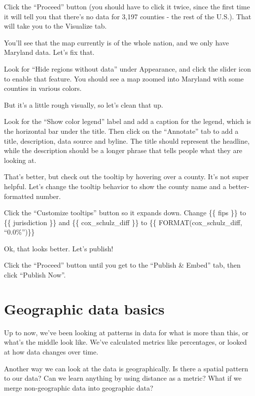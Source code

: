 \documentclass[
  letterpaper,
  DIV=11,
  numbers=noendperiod]{scrreprt}
\begin{document}
Click the ``Proceed'' button (you should have to click it twice, since
the first time it will tell you that there's no data for 3,197 counties
- the rest of the U.S.). That will take you to the Visualize tab.

You'll see that the map currently is of the whole nation, and we only
have Maryland data. Let's fix that.

Look for ``Hide regions without data'' under Appearance, and click the
slider icon to enable that feature. You should see a map zoomed into
Maryland with some counties in various colors.

But it's a little rough visually, so let's clean that up.

Look for the ``Show color legend'' label and add a caption for the
legend, which is the horizontal bar under the title. Then click on the
``Annotate'' tab to add a title, description, data source and byline.
The title should represent the headline, while the description should be
a longer phrase that tells people what they are looking at.

That's better, but check out the tooltip by hovering over a county. It's
not super helpful. Let's change the tooltip behavior to show the county
name and a better-formatted number.

Click the ``Customize tooltips'' button so it expands down. Change \{\{
fips \}\} to \{\{ jurisdiction \}\} and \{\{ cox\_schulz\_diff \}\} to
\{\{ FORMAT(cox\_schulz\_diff, ``0.0\%'')\}\}

Ok, that looks better. Let's publish!

Click the ``Proceed'' button until you get to the ``Publish \& Embed''
tab, then click ``Publish Now''.


\hypertarget{geographic-data-basics}{%
\chapter{Geographic data basics}\label{geographic-data-basics}}

Up to now, we've been looking at patterns in data for what is more than
this, or what's the middle look like. We've calculated metrics like
percentages, or looked at how data changes over time.

Another way we can look at the data is geographically. Is there a
spatial pattern to our data? Can we learn anything by using distance as
a metric? What if we merge non-geographic data into geographic data?
\end{document}
